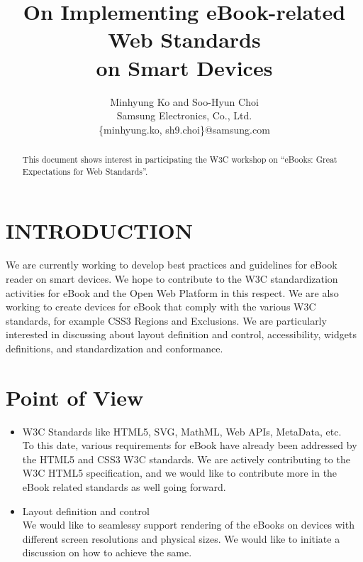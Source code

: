 \documentclass[a4paper]{spie}  %
\title{On Implementing eBook-related Web Standards \\ on Smart Devices}
\author{Minhyung Ko and Soo-Hyun Choi\\
Samsung Electronics, Co., Ltd. \\
\{\textsf{minhyung.ko, sh9.choi\}@samsung.com}\\
}
\begin{document}
\maketitle

\begin{abstract}
This document shows interest in participating the W3C workshop on ``eBooks: 
Great Expectations for Web Standards''.
\end{abstract}



\section{INTRODUCTION}
\label{sect:intro}  %
We are currently working to develop best practices and guidelines for eBook 
reader on smart devices. We hope to contribute to the W3C standardization 
activities for eBook and the Open Web Platform in this respect. We are also 
working to create devices for eBook that comply with the various W3C standards, 
for example CSS3 Regions and Exclusions. We are particularly interested in 
discussing about layout definition and control, accessibility, widgets 
definitions, and standardization and conformance.


\section{Point of View} \label{sect:view}

\begin{itemize}

    \item \textsf{W3C Standards like HTML5, SVG, MathML, Web APIs, MetaData, 
        etc.}  \\
        To this date, various requirements for eBook have already been addressed 
        by the HTML5 and CSS3 W3C standards. We are actively contributing to the 
W3C HTML5 specification, and we would like to contribute more in the eBook 
related standards as well going forward.

    \item \textsf{Layout definition and control} \\
        We would like to seamlessy support rendering of the eBooks on devices 
        with different screen resolutions and physical sizes. We would like to 
        initiate a discussion on how to achieve the same.

\end{itemize}
\end{document}
